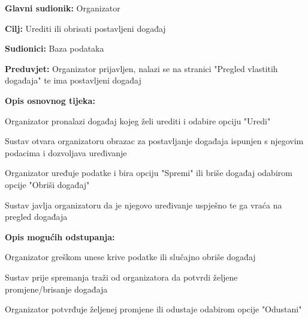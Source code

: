 					\noindent {}
\begin{packed_item}
	\item \textbf{Glavni sudionik:} Organizator
	\item  \textbf{Cilj:} Urediti ili obrisati postavljeni događaj
	\item  \textbf{Sudionici:} Baza podataka
	\item  \textbf{Preduvjet:} Organizator prijavljen, nalazi se na stranici "Pregled vlastitih događaja" te ima postavljeni događaj
	\item  \textbf{Opis osnovnog tijeka:}
	
	\item[] \begin{packed_enum}
		
		\item Organizator pronalazi događaj kojeg želi urediti i odabire opciju "Uredi"
		\item Sustav otvara organizatoru obrazac za postavljanje događaja ispunjen s njegovim podacima i dozvoljava uređivanje
		\item Organizator uređuje podatke i bira opciju "Spremi" ili briše događaj odabirom opcije "Obriši događaj"
		\item Sustav javlja organizatoru da je njegovo uređivanje uspješno te ga vraća na pregled događaja
	\end{packed_enum}
	
	\item  \textbf{Opis mogućih odstupanja:}
	
	\item[] \begin{packed_item}
		
		\item[3.a] Organizator greškom unese krive podatke ili slučajno obriše događaj
		\item[] \begin{packed_enum}
			
			\item Sustav prije spremanja traži od organizatora da potvrdi željene promjene/brisanje događaja
			\item Organizator potvrđuje željenej promjene ili odustaje odabirom opcije "Odustani"
			
		\end{packed_enum}
	\end{packed_item}
\end{packed_item}



